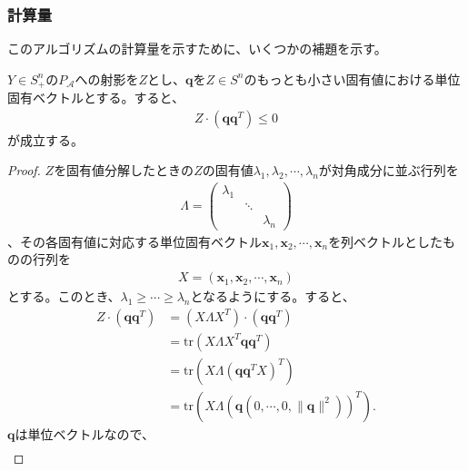 \subsubsection{計算量}
このアルゴリズムの計算量を示すために、いくつかの補題を示す。
\begin{lemma} \label{NegativeInnerProduct}
  $Y \in S_+^n$の$P_\mathcal{A}$への射影を$Z$とし、$\mathbf{q}$を$Z \in S^n$のもっとも小さい固有値における単位固有ベクトルとする。すると、
  \begin{align*}
    Z \cdot \left(\mathbf{q} \mathbf{q}^T\right) \leq 0
  \end{align*}
  が成立する。
\end{lemma}
\begin{proof}
  $Z$を固有値分解したときの$Z$の固有値$\lambda_1, \lambda_2, \cdots, \lambda_n$が対角成分に並ぶ行列を
  \begin{align*}
    \Lambda = \left(
                \begin{array}{ccc}
                  \lambda_1 &        & \\
                            & \ddots & \\
                            &        & \lambda_n
                \end{array}
              \right)
  \end{align*}
  、その各固有値に対応する単位固有ベクトル$\mathbf{x}_1, \mathbf{x}_2, \cdots, \mathbf{x}_n$を列ベクトルとしたものの行列を
  \begin{align*}
    X = \left(\mathbf{x}_1, \mathbf{x}_2, \cdots, \mathbf{x}_n\right)
  \end{align*}
  とする。このとき、$\lambda_1 \geq \cdots \geq \lambda_n$となるようにする。すると、
  \begin{align*}
    Z \cdot \left(\mathbf{q} \mathbf{q}^T\right) & = \left(X \Lambda X^T\right) \cdot \left(\mathbf{q} \mathbf{q}^T\right) \\
                                                 & = \mathrm{tr}\left(X \Lambda X^T \mathbf{q} \mathbf{q}^T\right) \\
                                                 & = \mathrm{tr}\left(X \Lambda \left(\mathbf{q} \mathbf{q}^T X\right)^T\right) \\
                                                 & = \mathrm{tr}\left(X \Lambda \left(\mathbf{q} \left(0, \cdots, 0, \|\mathbf{q}\|^2\right)\right)^T\right).
  \end{align*}
  $\mathbf{q}$は単位ベクトルなので、
  \begin{align*}

\end{align*}
\end{proof}
